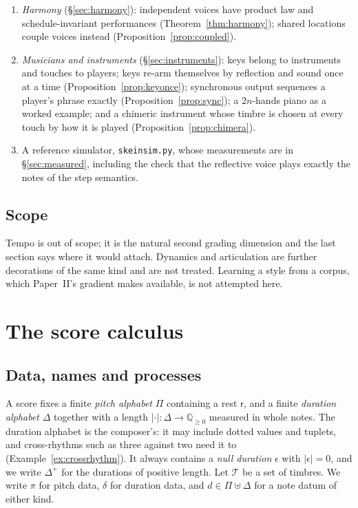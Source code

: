 \documentclass[11pt,a4paper]{article}
\theoremstyle{plain}
\theoremstyle{definition}
\theoremstyle{remark}
\newcommand{\Pit}{\Pi}
\newcommand{\Dur}{\Delta}
\newcommand{\Tim}{\mathcal{T}}
\newcommand{\len}[1]{|#1|}
\newcommand{\nulld}{\epsilon}
\newcommand{\rest}{\mathsf{r}}
\begin{document}
\begin{enumerate}[leftmargin=*,itemsep=2pt]
  (\S\ref{ssec:exchange}).
\item \emph{Harmony} (\S\ref{sec:harmony}): independent voices have product law
  and schedule-invariant performances (Theorem~\ref{thm:harmony}); shared
  locations couple voices instead (Proposition~\ref{prop:coupled}).
\item \emph{Musicians and instruments} (\S\ref{sec:instruments}): keys belong to
  instruments and touches to players; keys re-arm themselves by reflection and
  sound once at a time (Proposition~\ref{prop:keyonce}); synchronous output
  sequences a player's phrase exactly (Proposition~\ref{prop:sync}); a
  $2n$-hands piano as a worked example; and a chimeric instrument whose timbre
  is chosen at every touch by how it is played (Proposition~\ref{prop:chimera}).
\item A reference simulator, \texttt{skeinsim.py}, whose measurements are in
  \S\ref{sec:measured}, including the check that the reflective voice plays exactly
the notes of the step semantics.
\end{enumerate}

\subsection{Scope}

Tempo is out of scope; it is the natural second grading dimension and the last
section says where it would attach. Dynamics and articulation are further
decorations of the same kind and are not treated. Learning a style from a
corpus, which Paper~II's gradient makes available, is not attempted here.

\section{The score calculus}\label{sec:calculus}

\subsection{Data, names and processes}

A score fixes a finite \emph{pitch alphabet} $\Pit$ containing a rest $\rest$,
and a finite \emph{duration alphabet} $\Dur$ together with a length
$\len{\cdot} : \Dur \to \mathbb{Q}_{\geq 0}$ measured in whole notes. The
duration alphabet is the composer's: it may include dotted values and tuplets,
and cross-rhythms such as three against two need it to
(Example~\ref{ex:crossrhythm}). It always contains a \emph{null duration}
$\nulld$ with $\len{\nulld} = 0$, and we write $\Dur^+$ for the durations of
positive length. Let $\Tim$ be a
set of timbres. We write $\pi$ for pitch data, $\delta$ for duration data, and
$d \in \Pit \uplus \Dur$ for a note datum of either kind.
\end{document}
